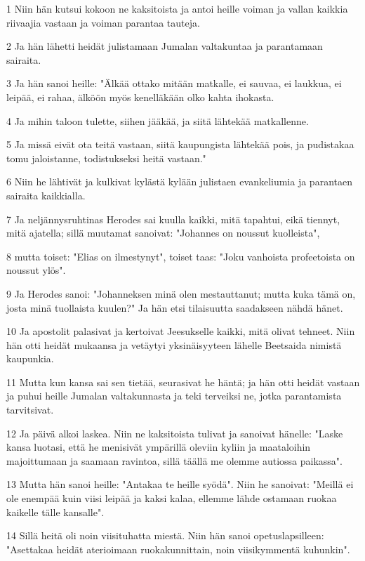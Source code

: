\par 1 Niin hän kutsui kokoon ne kaksitoista ja antoi heille voiman ja vallan kaikkia riivaajia vastaan ja voiman parantaa tauteja.
\par 2 Ja hän lähetti heidät julistamaan Jumalan valtakuntaa ja parantamaan sairaita.
\par 3 Ja hän sanoi heille: "Älkää ottako mitään matkalle, ei sauvaa, ei laukkua, ei leipää, ei rahaa, älköön myös kenelläkään olko kahta ihokasta.
\par 4 Ja mihin taloon tulette, siihen jääkää, ja siitä lähtekää matkallenne.
\par 5 Ja missä eivät ota teitä vastaan, siitä kaupungista lähtekää pois, ja pudistakaa tomu jaloistanne, todistukseksi heitä vastaan."
\par 6 Niin he lähtivät ja kulkivat kylästä kylään julistaen evankeliumia ja parantaen sairaita kaikkialla.
\par 7 Ja neljännysruhtinas Herodes sai kuulla kaikki, mitä tapahtui, eikä tiennyt, mitä ajatella; sillä muutamat sanoivat: "Johannes on noussut kuolleista",
\par 8 mutta toiset: "Elias on ilmestynyt", toiset taas: "Joku vanhoista profeetoista on noussut ylös".
\par 9 Ja Herodes sanoi: "Johanneksen minä olen mestauttanut; mutta kuka tämä on, josta minä tuollaista kuulen?" Ja hän etsi tilaisuutta saadakseen nähdä hänet.
\par 10 Ja apostolit palasivat ja kertoivat Jeesukselle kaikki, mitä olivat tehneet. Niin hän otti heidät mukaansa ja vetäytyi yksinäisyyteen lähelle Beetsaida nimistä kaupunkia.
\par 11 Mutta kun kansa sai sen tietää, seurasivat he häntä; ja hän otti heidät vastaan ja puhui heille Jumalan valtakunnasta ja teki terveiksi ne, jotka parantamista tarvitsivat.
\par 12 Ja päivä alkoi laskea. Niin ne kaksitoista tulivat ja sanoivat hänelle: "Laske kansa luotasi, että he menisivät ympärillä oleviin kyliin ja maataloihin majoittumaan ja saamaan ravintoa, sillä täällä me olemme autiossa paikassa".
\par 13 Mutta hän sanoi heille: "Antakaa te heille syödä". Niin he sanoivat: "Meillä ei ole enempää kuin viisi leipää ja kaksi kalaa, ellemme lähde ostamaan ruokaa kaikelle tälle kansalle".
\par 14 Sillä heitä oli noin viisituhatta miestä. Niin hän sanoi opetuslapsilleen: "Asettakaa heidät aterioimaan ruokakunnittain, noin viisikymmentä kuhunkin".
